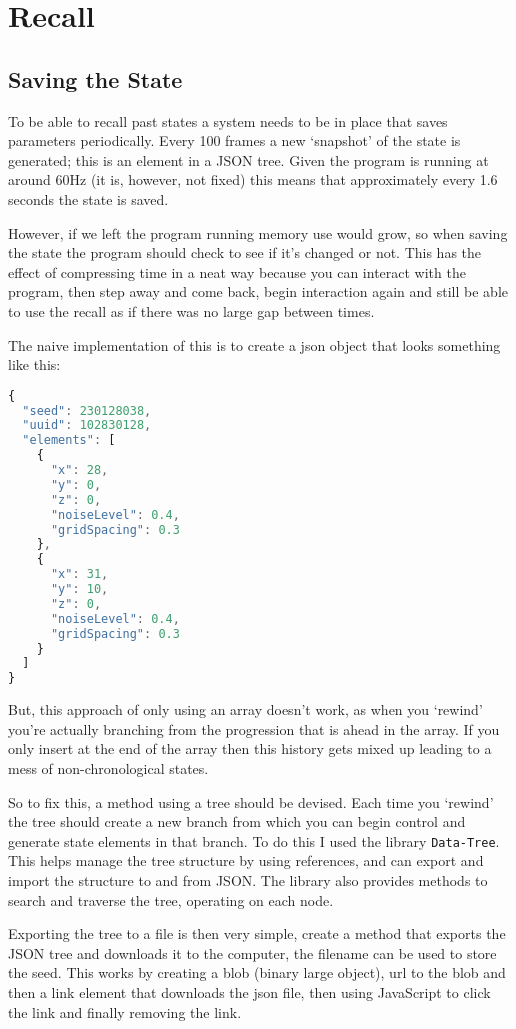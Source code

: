 \chapter{Recall}
\section{Saving the State}
To be able to recall past states a system needs to be in place that saves
parameters periodically. Every 100 frames a new `snapshot' of the state is
generated; this is an element in a JSON tree. Given the program is running at
around 60Hz (it is, however, not fixed) this means that approximately every 1.6
seconds the state is saved.

However, if we left the program running memory use would grow, so when saving
the state the program should check to see if it's changed or not. This has the
effect of compressing time in a neat way because you can interact with the
program, then step away and come back, begin interaction again and still be able
to use the recall as if there was no large gap between times.

The naive implementation of this is to create a json object that looks something
like this:

\begin{lstlisting}[language=javascript]
{
  "seed": 230128038,
  "uuid": 102830128,
  "elements": [
    {
      "x": 28,
      "y": 0,
      "z": 0,
      "noiseLevel": 0.4,
      "gridSpacing": 0.3
    },
    {
      "x": 31,
      "y": 10,
      "z": 0,
      "noiseLevel": 0.4,
      "gridSpacing": 0.3
    }
  ]
}
\end{lstlisting}

But, this approach of only using an array doesn't work, as when you `rewind'
you're actually branching from the progression that is ahead in the array. If
you only insert at the end of the array then this history gets mixed up leading
to a mess of non-chronological states.

So to fix this, a method using a tree should be devised. Each time you `rewind'
the tree should create a new branch from which you can begin control and
generate state elements in that branch. To do this I used the library 
\verb|Data-Tree|. This helps manage the tree structure by using references, and
can export and import the structure to and from JSON. The library also provides
methods to search and traverse the tree, operating on each node.

Exporting the tree to a file is then very simple, create a method that exports
the JSON tree and downloads it to the computer, the filename can be used to
store the seed. This works by creating a blob (binary large object), url to the
blob and then a link element that downloads the json file, then using JavaScript
to click the link and finally removing the link.

